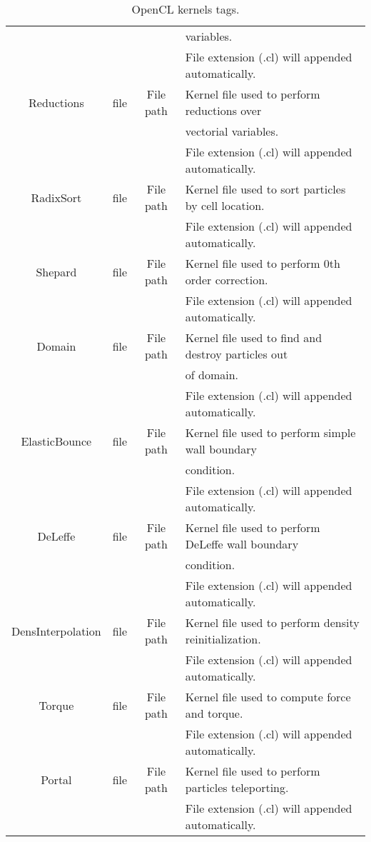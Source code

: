 \begin{table}[h!b!p!]
\begin{tabular}{| c | c | c | l | }
		                  &      &           & variables. \\
		                  &      &           & File extension (.cl) will appended automatically. \\
		\hline
		Reductions        & file & File path & Kernel file used to perform reductions over \\
		                  &      &           & vectorial variables. \\
		                  &      &           & File extension (.cl) will appended automatically. \\
		\hline
		RadixSort         & file & File path & Kernel file used to sort particles by cell location. \\
		                  &      &           & File extension (.cl) will appended automatically. \\
		\hline
		Shepard           & file & File path & Kernel file used to perform 0th order correction. \\
		                  &      &           & File extension (.cl) will appended automatically. \\
		\hline
		Domain            & file & File path & Kernel file used to find and destroy particles out \\
		                  &      &           & of domain. \\
		                  &      &           & File extension (.cl) will appended automatically. \\
		\hline
		ElasticBounce     & file & File path & Kernel file used to perform simple wall boundary \\
		                  &      &           & condition. \\
		                  &      &           & File extension (.cl) will appended automatically. \\
		\hline
		DeLeffe           & file & File path & Kernel file used to perform DeLeffe wall boundary \\
		                  &      &           & condition. \\
		                  &      &           & File extension (.cl) will appended automatically. \\
		\hline
		DensInterpolation & file & File path & Kernel file used to perform density reinitialization. \\
		                  &      &           & File extension (.cl) will appended automatically. \\
		\hline
		Torque            & file & File path & Kernel file used to compute force and torque. \\
		                  &      &           & File extension (.cl) will appended automatically. \\
		\hline
		Portal            & file & File path & Kernel file used to perform particles teleporting. \\
		                  &      &           & File extension (.cl) will appended automatically. \\
		\hline
	\end{tabular}
	\caption{OpenCL kernels tags.}
	\label{tables:caseSetup:OpenCL:Options}
\end{table}
%
